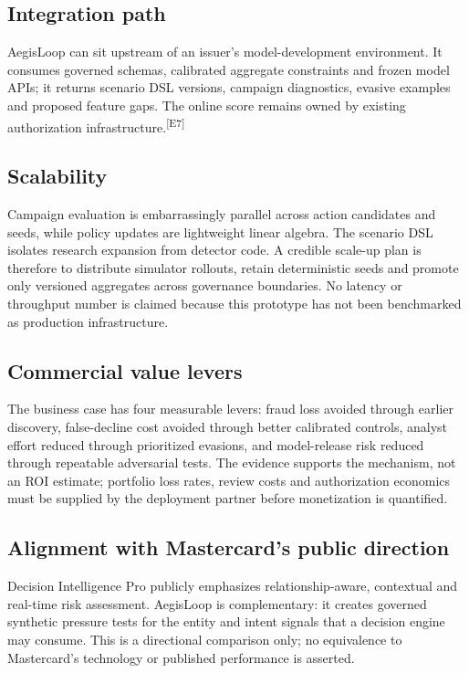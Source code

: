 \documentclass[11pt,a4paper,oneside]{article}
\newcommand{\evidence}[1]{\textsuperscript{\textcolor{EvidenceGray}{[#1]}}}
\begin{document}
\subsection{Integration path}
AegisLoop can sit upstream of an issuer's model-development environment. It consumes governed schemas, calibrated aggregate constraints and frozen model APIs; it returns scenario DSL versions, campaign diagnostics, evasive examples and proposed feature gaps. The online score remains owned by existing authorization infrastructure.\evidence{E7}

\subsection{Scalability}
Campaign evaluation is embarrassingly parallel across action candidates and seeds, while policy updates are lightweight linear algebra. The scenario DSL isolates research expansion from detector code. A credible scale-up plan is therefore to distribute simulator rollouts, retain deterministic seeds and promote only versioned aggregates across governance boundaries. No latency or throughput number is claimed because this prototype has not been benchmarked as production infrastructure.

\subsection{Commercial value levers}
The business case has four measurable levers: fraud loss avoided through earlier discovery, false-decline cost avoided through better calibrated controls, analyst effort reduced through prioritized evasions, and model-release risk reduced through repeatable adversarial tests. The evidence supports the mechanism, not an ROI estimate; portfolio loss rates, review costs and authorization economics must be supplied by the deployment partner before monetization is quantified.

\subsection{Alignment with Mastercard's public direction}
Decision Intelligence Pro publicly emphasizes relationship-aware, contextual and real-time risk assessment. AegisLoop is complementary: it creates governed synthetic pressure tests for the entity and intent signals that a decision engine may consume. This is a directional comparison only; no equivalence to Mastercard's technology or published performance is asserted.\cite{mastercard2024dipro}
\end{document}
